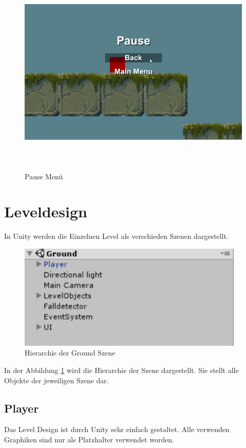 \begin{figure}[H]
	\includegraphics[height=10cm]{images/PauseMenu.png}
	\caption{Pause Menü}
\end{figure}

\section{Leveldesign}
In Unity werden die Einzelnen Level als verschieden Szenen dargestellt.

\begin{figure}[H]
	\includegraphics[height=5cm]{images/Ground.png}
	\caption{Hierarchie der Ground Szene}
	\label{hierarchieGround}
\end{figure}
In der Abbildung \ref{hierarchieGround} wird die Hierarchie der Szene dargestellt. Sie stellt alle Objekte der jeweiligen Szene dar. 
\subsection{Player}
Das Level Design ist durch Unity sehr einfach gestaltet. Alle verwenden Graphiken sind nur als Platzhalter verwendet worden.


